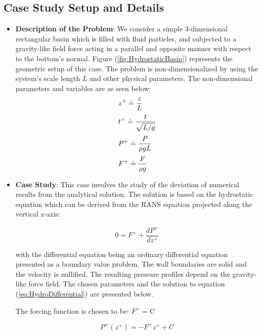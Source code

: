 \documentclass{../GPUSPHtemplate}
\begin{document}
\subsection{Case Study Setup and Details}
\vspace*{2pt}
\begin{itemize}
\item \textbf{Description of the Problem}: We consider a simple 3-dimensional rectangular basin which is
  filled with fluid particles, and subjected to a gravity-like field force acting in a parallel and
  opposite manner with respect to the bottom's normal. Figure (\ref{fig:HydrostaticBasin}) represents the
  geometric setup of this case. The problem is non-dimensionalized by using the system's scale length $L$
  and other physical parameters. The non-dimensional parameters and variables are as seen below:   
  \begin{equation}
    \begin{array}{l}
      \displaystyle{  z^{+} \doteq \frac{z}{L} } \medskip \\ 
      \displaystyle{  t^{+} \doteq \frac{t}{\sqrt{L/g}} } \medskip \\ 
      \displaystyle{  P^{+} \doteq \frac{P}{\rho gL} } \medskip \\ 
      \displaystyle{  F^{+} \doteq \frac{F}{\rho g} } 
    \end{array}
  \end{equation}  
  
\item \textbf{Case Study}:  This case involves the study of the deviation of numerical results
  from the analytical solution. The solution is based on the hydrostatic equation which can be
  derived from the RANS equation projected along the vertical z-axis: 
  
  \begin{equation}\label{eq:HydroDifferential}
    0 = F^{+}+ \frac{d P^+}{d z^+}
  \end{equation}
  
  with the differential equation being an ordinary differential equation presented as a boundary value problem.
  The wall boundaries are solid and the velocity is nullified. The resulting pressure profiles
  depend on the gravity-like force field. The chosen parameters and
  the solution to equation (\ref{eq:HydroDifferential}) are presented below.
  
  The forcing function is chosen to be: $ F^+ = \text{C}  $  
    
  \begin{equation}\label{eq:HydroStatic}
    P^+(z^+) =  -F^{+} z^+  + C
  \end{equation}
  

\end{itemize}
\end{document}

